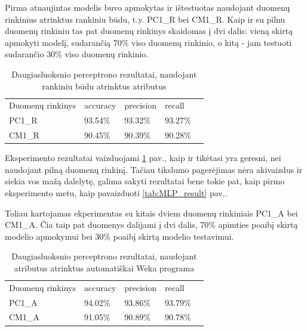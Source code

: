 \documentclass{VUMIFPSbakalaurinis}
\begin{document}
Pirma atnaujintas modelis buvo apmokytas ir ištestuotas naudojant duomenų rinkinius atrinktus rankiniu būdu, t.y. PC1\_R bei CM1\_R. Kaip ir su pilnu duomenų rinkiniu tas pat duomenų rinkinys skaidomas į dvi dalis: vieną skirtą apmokyti modelį, sudarančią 70\% viso duomenų rinkinio, o kitą - jam testuoti sudarančio 30\% viso duomenų rinkinio.

\begin{table}[H]\footnotesize
\centering
\caption{Daugiasluoksnio perceptrono rezultatai, naudojant rankiniu būdu atrinktus atributus}
\label{tab:MLP_result_1}
\begin{tabular}{lllll}
\cline{1-4}
\multicolumn{1}{|l}{Duomenų rinkinys} & accuracy & precision & \multicolumn{1}{l|}{recall} &  \\ \cline{1-4}
\multicolumn{1}{|l}{PC1\_R}              & 93.54\%   &93.32\%     & \multicolumn{1}{l|}{93.27\%} &  \\
\multicolumn{1}{|l}{CM1\_R}              & 90.45\%    & 90.39\%     & \multicolumn{1}{l|}{90.28\%}  &  \\ \cline{1-4}
\end{tabular}
\end{table}

Eksperimento rezultatai vaizduojami \ref{tab:MLP_result_1} pav., kaip ir tikėtasi yra geresni, nei naudojant pilną duomenų rinkinį. Tačiau tikslumo pagerėjimas nėra akivaizdus ir siekia vos mažą dalelytę, galima sakyti rezultatai bene tokie pat, kaip pirmo eksperimento metu, kaip pavaizduoti \ref{tab:MLP_result} pav..

Toliau kartojamas ekperimentas su kitais dviem duomenų rinkiniais PC1\_A bei CM1\_A. Čia taip pat duomenys dalijami į dvi dalis, 70\% apimties poaibį skirtą modelio apmokymui bei 30\% poaibį skirtą modelio testavimui.

\begin{table}[H]\footnotesize
\centering
\caption{Daugiasluoksnio perceptrono rezultatai, naudojant atributus atrinktus automatiškai Weka programa}
\label{tab:MLP_result_2}
\begin{tabular}{lllll}
\cline{1-4}
\multicolumn{1}{|l}{Duomenų rinkinys} & accuracy & precision & \multicolumn{1}{l|}{recall} &  \\ \cline{1-4}
\multicolumn{1}{|l}{PC1\_A}              & 94.02\%   & 93.86\%     & \multicolumn{1}{l|}{93.79\%} &  \\
\multicolumn{1}{|l}{CM1\_A}              & 91.05\%    & 90.89\%     & \multicolumn{1}{l|}{90.78\%}  &  \\ \cline{1-4}
\end{tabular}
\end{table}
\end{document}
